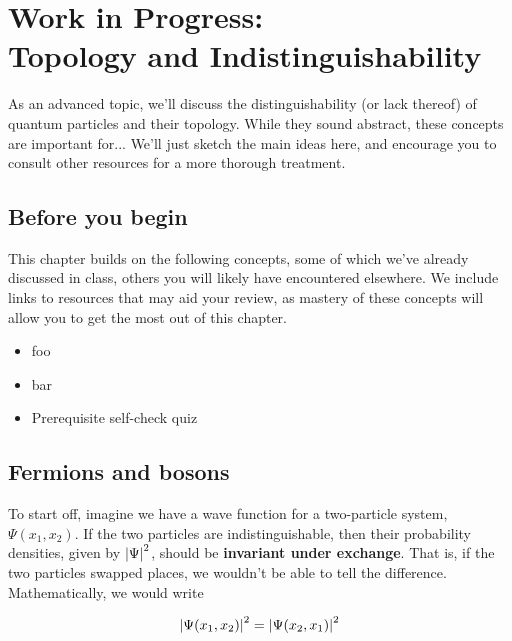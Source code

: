 \documentclass[12pt, english]{book}
\begin{document}
\chapter[Topology]{Work in Progress:\\Topology and Indistinguishability} \label{ch:topo}
As an advanced topic, we'll discuss the distinguishability (or lack thereof) of quantum particles and their topology.
While they sound abstract, these concepts are important for...
We'll just sketch the main ideas here, and encourage you to consult other resources for a more thorough treatment.



\section{Before you begin}

This chapter builds on the following concepts, some of which we've already discussed in class, others you will likely have encountered elsewhere.
We include links to resources that may aid your review, as mastery of these concepts will allow you to get the most out of this chapter.

\begin{itemize}
	\item foo 
	\item bar 
	\item Prerequisite self-check quiz 
\end{itemize}



\section{Fermions and bosons}

To start off, imagine we have a wave function for a two-particle system, $\Psi(x_1, x_2)$.
If the two particles are indistinguishable, then their probability densities, given by $\abs{\Psi}^2$, should be \textbf{invariant under exchange}.
That is, if the two particles swapped places, we wouldn't be able to tell the difference.
Mathematically, we would write

\begin{equation}
	\abs{\Psi(x_1, x_2)}^2 = \abs{\Psi(x_2, x_1)}^2  \label{eq:swapped}
\end{equation}
\end{document}
